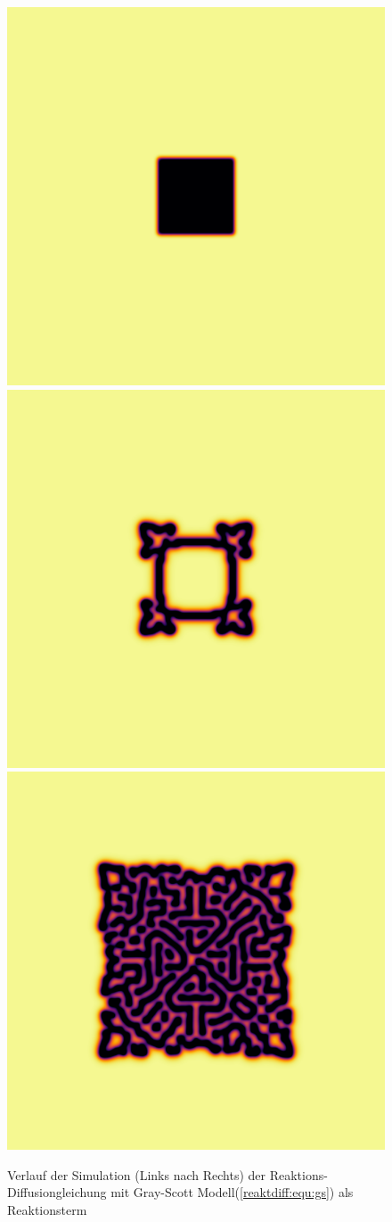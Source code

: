 \begin{figure}
    \centering
    \includegraphics[width=0.32\linewidth]{papers/reaktdiff/images/GrayScott/gs_n1.png}
    \includegraphics[width=0.32\linewidth]{papers/reaktdiff/images/GrayScott/gs_n300.png}
    \includegraphics[width=0.32\linewidth]{papers/reaktdiff/images/GrayScott/gs_n999.png}
    \caption{Verlauf der Simulation (Links nach Rechts) der Reaktions-Diffusiongleichung mit Gray-Scott Modell(\eqref{reaktdiff:equ:gs}) als Reaktionsterm}
    \label{reaktdiff:fig:gs}
\end{figure}

